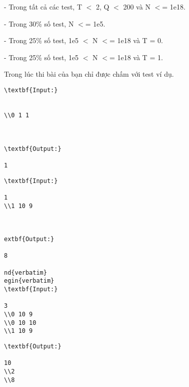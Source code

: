 - Trong tất cả các test, T $<$ 2, Q $<$ 200 và N $<$= 1e18.

- Trong 30\% số test, N $<$= 1e5.

- Trong 25\% số test, 1e5 $<$ N $<$= 1e18 và T = 0.

- Trong 25\% số test, 1e5 $<$ N $<$= 1e18 và T = 1.

Trong lúc thi bài của bạn chỉ được chấm với test ví dụ.
\begin{verbatim}
\textbf{Input:}


\\0 1 1



\textbf{Output:}

1

\end{verbatim}
\begin{verbatim}
\textbf{Input:}

1
\\1 10 9



extbf{Output:}

8

nd{verbatim}
egin{verbatim}
\textbf{Input:}

3
\\0 10 9
\\0 10 10
\\1 10 9 \end{verbatim}
\begin{verbatim}
\textbf{Output:}

10
\\2
\\8 \end{verbatim}